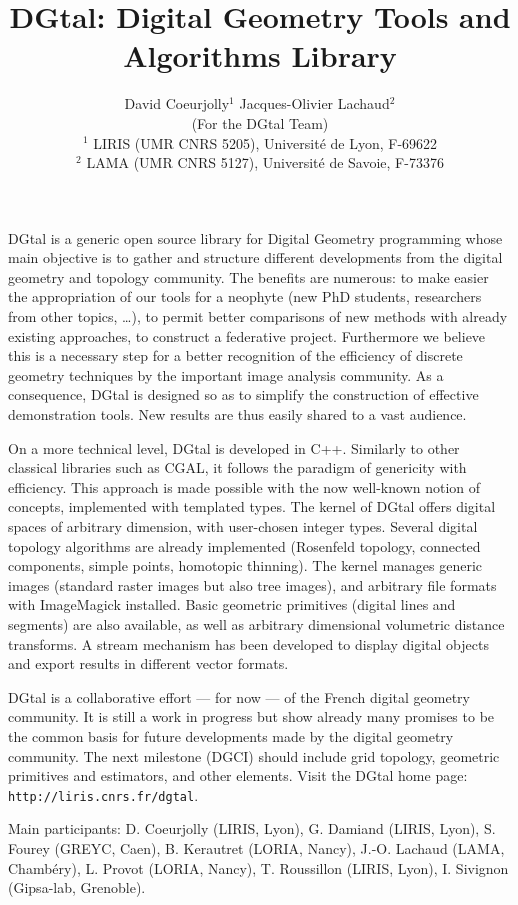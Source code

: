 \documentclass{article}
\title{DGtal: Digital  Geometry Tools and Algorithms Library}
\author{David Coeurjolly$^1$ \qquad \qquad Jacques-Olivier Lachaud$^2$ \\
  (For the DGtal Team)\\
${}^1$ LIRIS (UMR CNRS 5205), Universit\'{e} de Lyon, F-69622 \\
${}^2$ LAMA (UMR CNRS 5127), Universit\'{e} de Savoie, F-73376\\
}
\date{}
\begin{document}
\maketitle

DGtal is a generic open source library for Digital Geometry
programming whose main objective is to gather and structure different
developments from the digital geometry and topology community. The
benefits are numerous: to make easier the appropriation of our tools
for a neophyte (new PhD students, researchers from other topics,
\ldots), to permit better comparisons of new methods with already
existing approaches, to construct a federative project. Furthermore we
believe this is a necessary step for a better recognition of the
efficiency of discrete geometry techniques by the important image
analysis community. As a consequence, DGtal is designed so as to
simplify the construction of effective demonstration tools. New
results are thus easily shared to a vast audience. 

On a more technical level, DGtal is developed in C++. Similarly to
other classical libraries such as CGAL, it follows the paradigm of
genericity with efficiency. This approach is made possible with the
now well-known notion of concepts, implemented with templated
types. The kernel of DGtal offers digital spaces of arbitrary
dimension, with user-chosen integer types. Several digital topology
algorithms are already implemented (Rosenfeld topology, connected
components, simple points, homotopic thinning). The kernel manages
generic images (standard raster images but also tree images), and
arbitrary file formats with ImageMagick installed. Basic geometric
primitives (digital lines and segments) are also available, as well as
arbitrary dimensional volumetric distance transforms. A stream
mechanism has been developed to display digital objects and export
results in different vector formats.

DGtal is a collaborative effort --- for now --- of the French digital
geometry community. It is still a work in progress but show already
many promises to be the common basis for future developments made by
the digital geometry community. The next milestone (DGCI) should
include grid topology, geometric primitives and estimators, and other
elements. Visit the DGtal home page: \texttt{http://liris.cnrs.fr/dgtal}.

Main participants: D. Coeurjolly (LIRIS, Lyon), G. Damiand (LIRIS,
Lyon), S. Fourey (GREYC, Caen), B. Kerautret (LORIA, Nancy),
J.-O. Lachaud (LAMA, Chambéry), L. Provot (LORIA, Nancy),
T. Roussillon (LIRIS, Lyon), I. Sivignon (Gipsa-lab, Grenoble).
\end{document}
